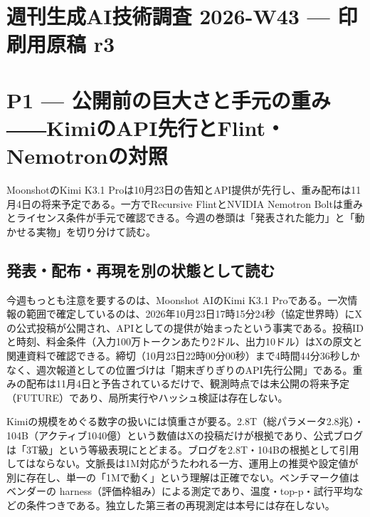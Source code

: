 \documentclass[lualatex,a4paper,10pt]{jlreq}
\begin{document}
\surveycover
\clearpage
\tableofcontents
\clearpage

\section*{週刊生成AI技術調査 2026-W43 --- 印刷用原稿 r3}
\label{sec:cover-title}


\section{P1 --- 公開前の巨大さと手元の重み――KimiのAPI先行とFlint・Nemotronの対照}
\label{sec:P1}


MoonshotのKimi K3.1 Proは10月23日の告知とAPI提供が先行し、重み配布は11月4日の将来予定である。一方でRecursive FlintとNVIDIA Nemotron Boltは重みとライセンス条件が手元で確認できる。今週の巻頭は「発表された能力」と「動かせる実物」を切り分けて読む。


\subsection*{発表・配布・再現を別の状態として読む}


今週もっとも注意を要するのは、Moonshot AIのKimi K3.1 Proである。一次情報の範囲で確定しているのは、2026年10月23日17時15分24秒（協定世界時）にXの公式投稿が公開され、APIとしての提供が始まったという事実である。投稿IDと時刻、料金条件（入力100万トークンあたり2ドル、出力10ドル）はXの原文と関連資料で確認できる。締切（10月23日22時00分00秒）まで4時間44分36秒しかなく、週次報道としての位置づけは「期末ぎりぎりのAPI先行公開」である。重みの配布は11月4日と予告されているだけで、観測時点では未公開の将来予定（FUTURE）であり、局所実行やハッシュ検証は存在しない。


Kimiの規模をめぐる数字の扱いには慎重さが要る。2.8T（総パラメータ2.8兆）・104B（アクティブ1040億）という数値はXの投稿だけが根拠であり、公式ブログは「3T級」という等級表現にとどまる。ブログを2.8T・104Bの根拠として引用してはならない。文脈長は1M対応がうたわれる一方、運用上の推奨や設定値が別に存在し、単一の「1Mで動く」という理解は正確でない。ベンチマーク値はベンダーの harness（評価枠組み）による測定であり、温度・top-p・試行平均などの条件つきである。独立した第三者の再現測定は本号には存在しない。
\end{document}
